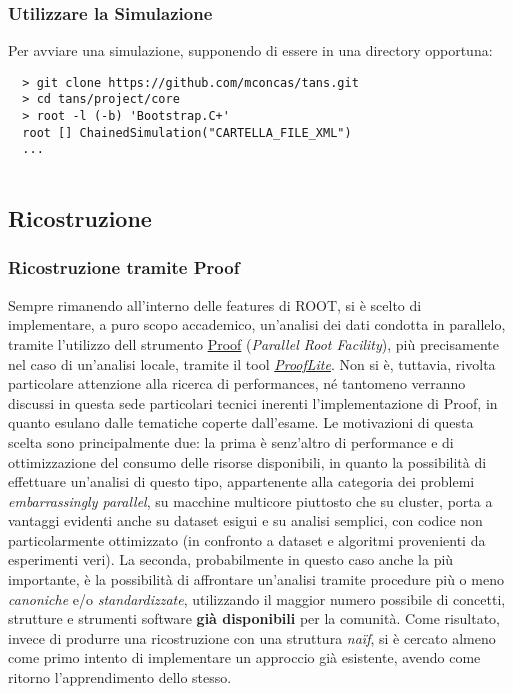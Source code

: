 \documentclass{article}
\begin{document}
\subsubsection{Utilizzare la Simulazione}
\noindent Per avviare una simulazione, supponendo di essere in una directory opportuna:
\begin{verbatim}
  > git clone https://github.com/mconcas/tans.git
  > cd tans/project/core
  > root -l (-b) 'Bootstrap.C+'
  root [] ChainedSimulation("CARTELLA_FILE_XML")
  ...
  
\end{verbatim}

\subsection{Ricostruzione}
\subsubsection{Ricostruzione tramite Proof}
Sempre rimanendo all'interno delle features di ROOT, si è scelto di implementare, a puro scopo accademico, un'analisi dei dati condotta in parallelo, tramite l'utilizzo dell strumento \href{http://root.cern.ch/drupal/content/proof}{Proof} (\textit{Parallel Root Facility}), più precisamente nel caso di un'analisi locale, tramite il tool \textit{\href{http://root.cern.ch/drupal/content/proof-multicore-desktop-laptop-proof-lite}{ProofLite}}. 
Non si è, tuttavia, rivolta particolare attenzione alla ricerca di performances, n\'e tantomeno verranno discussi in questa sede particolari tecnici inerenti l'implementazione di Proof, in quanto esulano dalle tematiche coperte dall'esame.\newline
Le motivazioni di questa scelta sono principalmente due: la prima è senz'altro di performance e di ottimizzazione del consumo delle risorse disponibili, in quanto la possibilità di effettuare un'analisi di questo tipo, appartenente alla categoria dei problemi \textit{embarrassingly parallel}, su macchine multicore piuttosto che su cluster, porta a vantaggi evidenti anche su dataset esigui e su analisi semplici, con codice non particolarmente ottimizzato (in confronto a dataset e algoritmi provenienti da esperimenti veri).  
La seconda, probabilmente in questo caso anche la più importante, è la possibilità di affrontare un'analisi tramite procedure più o meno \textit{canoniche} e/o \textit{standardizzate}, utilizzando il maggior numero possibile di concetti, strutture e strumenti software \textbf{già disponibili} per la comunità. Come risultato, invece di produrre una ricostruzione con una struttura \textit{naïf}, si è cercato almeno come primo intento di implementare un approccio già esistente, avendo come ritorno l'apprendimento dello stesso.
\end{document}
